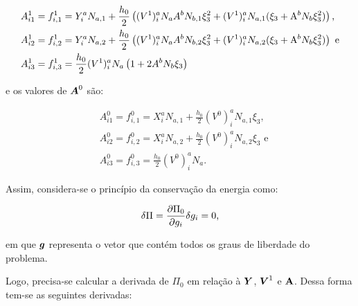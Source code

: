 \begin{subequations}
    \begin{align}
         & A_{i1}^1=f_{i,1}^1=Y_i^aN_{a,1}+\frac{h_0}{2}\left({(V^1)_i^aN_aA^bN_{b,1}\xi_3^2+(V^1)_i^aN_{a,1}(\xi_3+\mathrm{A}^bN_b\xi_3^2)}\right)\text{,}  \\
         & A_{i2}^1=f_{i,2}^1=Y_i^aN_{a,2}+\frac{h_0}{2}\left({(V^1)_i^aN_aA^bN_{b,2}\xi_3^2+(V^1)_i^aN_{a,2}(\xi_3+\mathrm{A}^bN_b\xi_3^2)}\right)\text{ e} \\
         & A_{i3}^1=f_{i,3}^1=\frac{h_0}{2}(V^1)_i^aN_a\left({1+2A^bN_b\xi_3}\right)
    \end{align}
    \label{eq:CSD-A1}
\end{subequations}

\noindent e os valores de $\boldsymbol{A}^0$ são:

\begin{subequations}
    \begin{align}
         & A_{i1}^0=f_{i,1}^0=X_i^aN_{a,1}+\frac{h_0}{2}(V^0)_i^aN_{a,1}\xi_3\text{,}  \\
         & A_{i2}^0=f_{i,2}^0=X_i^aN_{a,2}+\frac{h_0}{2}(V^0)_i^aN_{a,2}\xi_3\text{ e} \\
         & A_{i3}^0=f_{i,3}^0=\frac{h_0}{2}(V^0)_i^aN_a\text{.}
    \end{align}
    \label{eq:CSD-A0}
\end{subequations}

Assim, considera-se o princípio da conservação da energia como:

\begin{equation}
    \delta\Pi=\frac{\partial{\Pi_0}}{\partial{g_i}}\delta g_i=0\text{,}
\end{equation}

\noindent em que $\boldsymbol{g}$ representa o vetor que contém todos os graus de liberdade do problema.

Logo, precisa-se calcular a derivada de $\Pi_0$ em relação à $\boldsymbol{Y}$, $\boldsymbol{V}^1$ e $\boldsymbol{\mathrm{A}}$. Dessa forma tem-se as seguintes derivadas:


